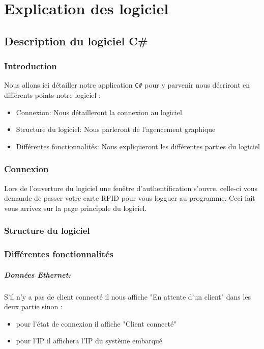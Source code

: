 \documentclass[12pt,a4paper]{report}
\begin{document}
			
\chapter{Explication des logiciel}
	\section{Description du logiciel C\#}
		\subsection{Introduction}
		Nous allons ici détailler notre application \verb+C#+ pour y parvenir nous décriront en différents points notre logiciel : 
			\begin{itemize}
			\item Connexion: Nous détailleront la connexion au logiciel
			\item Structure du logiciel: Nous parleront de l'agencement graphique
			\item Différentes fonctionnalités: Nous expliqueront les différentes parties du logiciel
			\end{itemize}
		\subsection{Connexion}
		Lors de l'ouverture du logiciel une fenêtre d'authentification s'ouvre, celle-ci  vous demande de passer votre carte RFID pour vous logguer au programme. Ceci fait vous arrivez sur la page principale du logiciel.
		\subsection{Structure du logiciel}
		
		\subsection{Différentes fonctionnalités}
			\paragraph{Données Ethernet:}S'il n'y a pas de client connecté il nous affiche "En attente d'un client" dans les deux partie sinon :
			\begin{itemize}
			\item pour l'état de connexion il affiche "Client connecté" 
			\item pour l'IP il affichera l'IP du système embarqué			
			\end{itemize}
\end{document}
